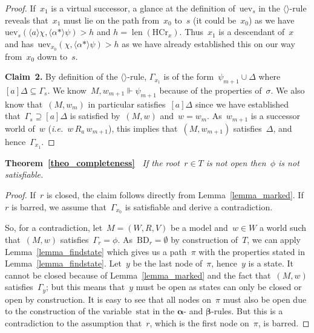 \documentclass{entcs}
\newcommand{\ie}{\emph{i.e.}}
\newcommand{\pea}[2]{\langle#1\rangle #2}
\newcommand{\paa}[2]{[#1] #2}
\newcommand{\prp}[1]{#1*}
\newcommand{\psr}[2]{#1 \Vdash #2}
\newcommand{\prel}[3]{#1 \,#2\, #3}
\newcommand{\thc}{\mathrm{HCr}}
\newcommand{\tbdia}{\mathrm{BD}}
\newcommand{\tmrk}{\mathrm{stat}}
\newcommand{\tuev}{\mathrm{uev}}
\newcommand{\talpha}{\boldsymbol{\alpha}}
\newcommand{\tbeta}{\boldsymbol{\beta}}
\newcommand{\trea}{$\langle\rangle$}
\newcommand{\llen}{\mathop{\mathrm{len}}}
\newcommand{\fchn}{\sigma}
\begin{document}
\begin{proof}
  If~$x_1$ is a virtual successor,
  a glance at the definition of~$\tuev_s$ in the \trea{}-rule reveals
  that~$x_1$ must lie on the path from~$x_0$ to~$s$ (it could be~$x_0$)
  as we have $\tuev_s(\pea{a}{\chi}, \pea{\prp{\alpha}}{\psi}) > h$ and $h = \llen(\thc_x)$.
  Thus~$x_1$ is a descendant of~$x$
  and has~$\tuev_{x_0}(\chi, \pea{\prp{\alpha}}{\psi}) > h$
  as we have already established this on our way from~$x_0$ down to~$s$.
  
  \noindent{}\textbf{Claim~2.}
  By definition of the \trea{}-rule,
  $\Gamma_{x_1}$ is of the form~$\psi_{m+1} \cup \Delta$ where~$\paa{a}{\Delta} \subseteq \Gamma_s$.
  We know~$\psr{M,w_{m+1}}{\psi_{m+1}}$ because of the properties of~$\fchn$.
  We also know that~$(M,w_m)$ in particular satisfies~$\paa{a}{\Delta}$
  since we have established that~$\Gamma_s \supseteq \paa{a}{\Delta}$
  is satisfied by~$(M,w)$ and~$w = w_m$.
  As~$w_{m+1}$ is a successor world of~$w$ (\ie{}~$\prel{w}{R_a}{w_{m+1}}$),
  this implies that~$(M,w_{m+1})$ satisfies~$\Delta$,
  and hence~$\Gamma_{x_1}$.
\end{proof}

\noindent{}\textbf{Theorem~\ref{theo_completeness}\ }
\emph{If the root~$r \in T$ is not open then~$\phi$ is not satisfiable.}
\begin{proof}
  If~$r$ is closed, the claim follows directly from Lemma~\ref{lemma_marked}.
  If~$r$ is barred, 
  we assume that~$\Gamma_{x_0}$ is satisfiable and derive a contradiction.

  So, for a contradiction,
  let~$M = (W,R,V)$ be a model and~$w \in W$ a world
  such that~$(M, w)$ satisfies~$\Gamma_r = \phi$.
  As~$\tbdia_r = \emptyset$ by construction of~$T$,
  we can apply Lemma~\ref{lemma_findstate}
  which gives us a path~$\pi$ with the properties stated in Lemma~\ref{lemma_findstate}.
  Let~$y$ be the last node of~$\pi$, hence~$y$ is a state.
  It cannot be closed because of Lemma~\ref{lemma_marked}
  and the fact that~$(M, w)$ satisfies~$\Gamma_y$;
  but this means that~$y$ must be open 
  as states can only be closed or open by construction.
  It is easy to see that all nodes on~$\pi$ must also be open 
  due to the construction of the variable~$\tmrk$ in the $\talpha$- and $\tbeta$-rules.
  But this is a contradiction to the assumption
  that~$r$, which is the first node on~$\pi$, is barred.
\end{proof}
\end{document}
